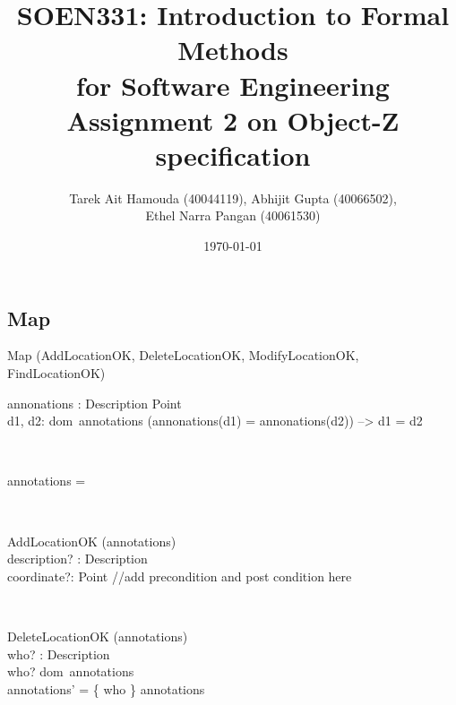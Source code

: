 \documentclass[12pt]{article}
\title{SOEN331: Introduction to Formal Methods\\for Software Engineering\\
Assignment 2 on Object-Z specification}
\author{Tarek Ait Hamouda (40044119), Abhijit Gupta (40066502),\\ 
Ethel Narra Pangan (40061530)}
\date{\today}
\begin{document}
\begin{spacing}{1.5}

\maketitle

\newpage

\section{Map}

\begin{class}{Map}
\also
\upharpoonright (AddLocationOK, DeleteLocationOK, ModifyLocationOK, FindLocationOK) \\
\begin{state}
annonations : Description \pfun Point\\
\where
\forall d1, d2: dom~annotations \bullet (annonations(d1) = annonations(d2)) --> d1 = d2
\end{state} \\
\begin{init}
annotations = \emptyset %
\end{init} \\
\begin{op}{AddLocationOK}
\Delta (annotations) \\
description? : Description\\
coordinate?: Point 
\ST
//add precondition and post condition here
\end{op}\\
\begin{op}{DeleteLocationOK}
\Delta (annotations) \\
who? : Description\\
\ST
who? \in dom~annotations\\
annotations' = \{ who \} \ndres annotations
\end{op}\\
\begin{op}{ModifyLocationsOK}
\Delta (annotations) \\
description? : Description\\
coordinates? : Point
\ST


}
\end{op}\\
\end{class}





\end{spacing}
\end{document}
